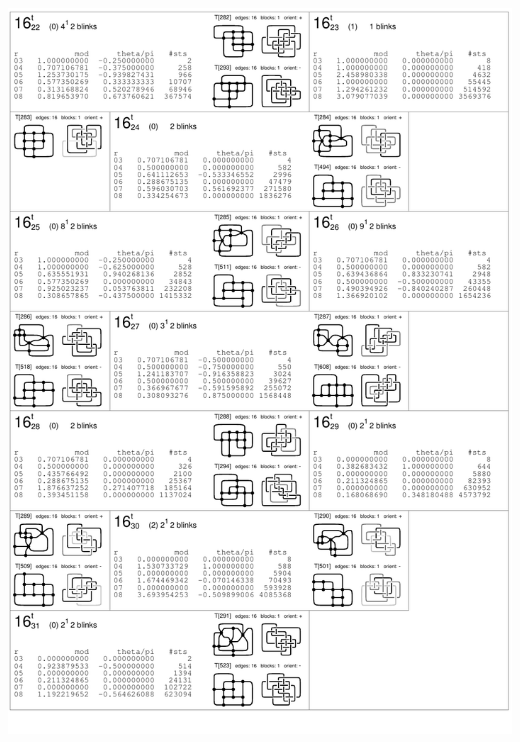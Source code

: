 \begin{center}
 \includegraphics[height=23.5cm]{E.figsbw2/con3catalog017_bw.pdf} \eject

\end{center}
